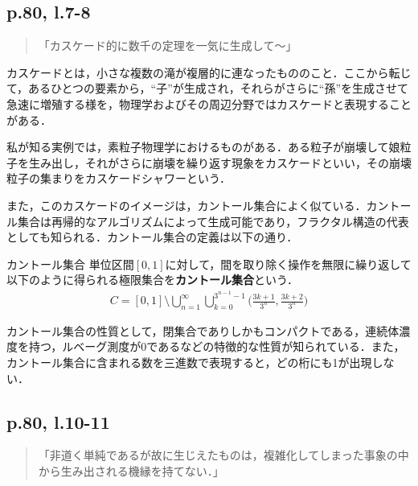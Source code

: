\documentclass[10pt, a5paper, twoside]{ltjsarticle}
\begin{document}
        \subsection{p.80, l.7-8}

            \begin{quote}
                「カスケード的に数千の定理を一気に生成して〜」
            \end{quote}

            カスケードとは，小さな複数の滝が複層的に連なったもののこと．ここから転じて，あるひとつの要素から，“子”が生成され，それらがさらに“孫”を生成させて急速に増殖する様を，物理学およびその周辺分野ではカスケードと表現することがある．

            私が知る実例では，素粒子物理学におけるものがある．ある粒子が崩壊して娘粒子を生み出し，それがさらに崩壊を繰り返す現象をカスケードといい，その崩壊粒子の集まりをカスケードシャワーという．

            また，このカスケードのイメージは，カントール集合によく似ている．カントール集合は再帰的なアルゴリズムによって生成可能であり，フラクタル構造の代表としても知られる．カントール集合の定義は以下の通り\cite{chaos1}．

            \begin{dfn}{カントール集合}{}
                単位区間$[0, 1]$に対して，間を取り除く操作を無限に繰り返して以下のように得られる極限集合を\textbf{カントール集合}という．
                \begin{align*}
                    C = [0, 1] \setminus \bigcup^{\infty}_{n=1} \bigcup^{3^{n-1}-1}_{k=0}\bigg(\frac{3k+1}{3^n}, \frac{3k+2}{3^n}\bigg)
                \end{align*}
            \end{dfn}

            カントール集合の性質として，閉集合でありしかもコンパクトである，連続体濃度を持つ，ルベーグ測度が0であるなどの特徴的な性質が知られている．また，カントール集合に含まれる数を三進数で表現すると，どの桁にも1が出現しない．

        \subsection{p.80, l.10-11}

            \begin{quote}
                「非道く単純であるが故に生じえたものは，複雑化してしまった事象の中から生み出される機縁を持てない．」
            \end{quote}
\end{document}
